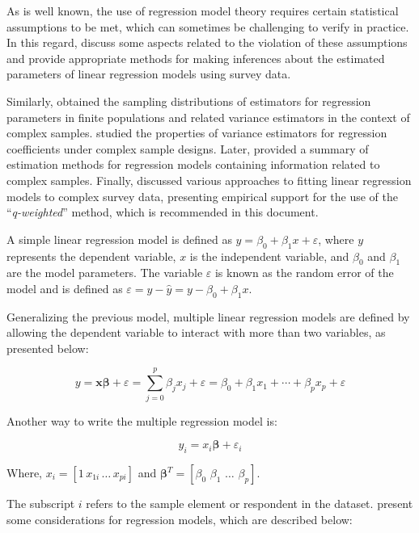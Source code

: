 \documentclass[
  12pt,
]{book}
\begin{document}
As is well known, the use of regression model theory requires certain statistical assumptions to be met, which can sometimes be challenging to verify in practice. In this regard, \citet{shah1977inference} discuss some aspects related to the violation of these assumptions and provide appropriate methods for making inferences about the estimated parameters of linear regression models using survey data.

Similarly, \citet{binder1983variances} obtained the sampling distributions of estimators for regression parameters in finite populations and related variance estimators in the context of complex samples. \citet{skinner1989analysis} studied the properties of variance estimators for regression coefficients under complex sample designs. Later, \citet{fuller2002regression} provided a summary of estimation methods for regression models containing information related to complex samples. Finally, \citet{pfeffermann2011modelling} discussed various approaches to fitting linear regression models to complex survey data, presenting empirical support for the use of the ``\emph{q-weighted}'' method, which is recommended in this document.

A simple linear regression model is defined as \(y=\beta_{0}+\beta_{1}x+\varepsilon\), where \(y\) represents the dependent variable, \(x\) is the independent variable, and \(\beta_{0}\) and \(\beta_{1}\) are the model parameters. The variable \(\varepsilon\) is known as the random error of the model and is defined as \(\varepsilon=y-\hat{y}=y-\beta_{0}+\beta_{1}x\).

Generalizing the previous model, multiple linear regression models are defined by allowing the dependent variable to interact with more than two variables, as presented below:

\[
y  =  \boldsymbol{x}\boldsymbol{\beta}+\varepsilon
  =  \sum_{j=0}^{p}\beta_{j}x_{j}+\varepsilon
 =  \beta_{0}+\beta_{1}x_{1}+\cdots+\beta_{p}x_{p}+\varepsilon
\]

Another way to write the multiple regression model is:

\[
y_{i}  =  x_{i}\boldsymbol{\beta}+\varepsilon_{i}
\]

Where, \(x_{i}=\left[1\,x_{1i}\,\ldots\,x_{pi}\right]\) and \(\boldsymbol{\beta}^{T}=\left[\beta_{0}\,\,\beta_{1}\,\,\ldots\,\,\beta_{p}\right]\).

The subscript \(i\) refers to the sample element or respondent in the dataset. \citet{Heeringa_West_Berglund_2017} present some considerations for regression models, which are described below:
\end{document}
